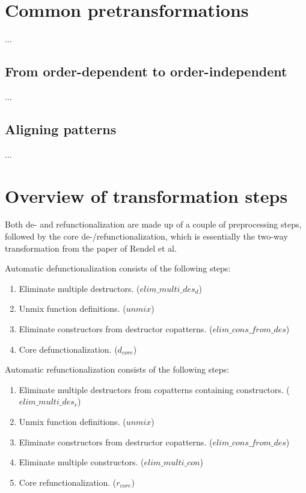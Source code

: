 \section{Common pretransformations}

...

\subsection{From order-dependent to order-independent}

...

\subsection{Aligning patterns}

...

\section{Overview of transformation steps}

Both de- and refunctionalization are made up of a couple of preprocessing steps, followed by the core de-/refunctionalization, which is essentially the two-way transformation from the paper of Rendel et al.

Automatic defunctionalization consists of the following steps:
\begin{enumerate}
\item Eliminate multiple destructors. ($elim\_multi\_des_d$)

\item Unmix function definitions. ($unmix$)

\item Eliminate constructors from destructor copatterns. ($elim\_cons\_from\_des$)

\item Core defunctionalization. ($d_{core}$)

\end{enumerate}

Automatic refunctionalization consists of the following steps:
\begin{enumerate}
\item Eliminate multiple destructors from copatterns containing constructors. ($elim\_multi\_des_r$)

\item Unmix function definitions. ($unmix$)

\item Eliminate constructors from destructor copatterns. ($elim\_cons\_from\_des$)

\item Eliminate multiple constructors. ($elim\_multi\_con$)

\item Core refunctionalization. ($r_{core}$)

\end{enumerate}

